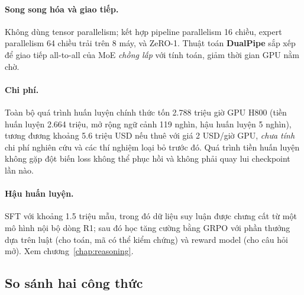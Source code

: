 \paragraph{Song song hóa và giao tiếp.} Không dùng tensor parallelism; kết hợp pipeline parallelism 16 chiều, expert parallelism 64 chiều trải trên 8 máy, và ZeRO-1. Thuật toán \textbf{DualPipe} sắp xếp để giao tiếp all-to-all của MoE \emph{chồng lấp} với tính toán, giảm thời gian GPU nằm chờ.

\paragraph{Chi phí.} Toàn bộ quá trình huấn luyện chính thức tốn 2.788 triệu giờ GPU H800 (tiền huấn luyện 2.664 triệu, mở rộng ngữ cảnh 119 nghìn, hậu huấn luyện 5 nghìn), tương đương khoảng 5.6 triệu USD nếu thuê với giá 2 USD/giờ GPU, \emph{chưa tính} chi phí nghiên cứu và các thí nghiệm loại bỏ trước đó. Quá trình tiền huấn luyện không gặp đột biến loss không thể phục hồi và không phải quay lui checkpoint lần nào.

\paragraph{Hậu huấn luyện.} SFT với khoảng 1.5 triệu mẫu, trong đó dữ liệu suy luận được chưng cất từ một mô hình nội bộ dòng R1; sau đó học tăng cường bằng GRPO với phần thưởng dựa trên luật (cho toán, mã có thể kiểm chứng) và reward model (cho câu hỏi mở). Xem chương~\ref{chap:reasoning}.

\subsection{So sánh hai công thức}
\label{ssec:recipe_comparison}

